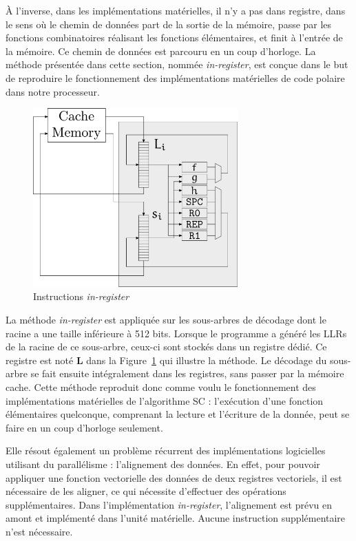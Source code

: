 \`A l'inverse, dans les implémentations matérielles, il n'y a pas dans registre, dans le sens où le chemin de données part de la sortie de la mémoire, passe par les fonctions combinatoires réalisant les fonctions élémentaires, et finit à l'entrée de la mémoire. Ce chemin de données est parcouru en un coup d'horloge. La méthode présentée dans cette section, nommée \textit{in-register}, est conçue dans le but de reproduire le fonctionnement des implémentations matérielles de code polaire dans notre processeur.

\begin{figure}[t]
\centering
\includegraphics[width=0.7\textwidth]{main/ch3_fig/in_register}
\caption{Instructions \textit{in-register}}
\label{fig:in-register}
\end{figure}

La méthode \textit{in-register} est appliquée sur les sous-arbres de décodage dont le \noeud racine a une taille inférieure à 512 bits.
Lorsque le programme a généré les LLRs de la racine de ce sous-arbre, ceux-ci sont stockés dans un registre dédié.
Ce registre est noté $\mathbold{L}$ dans la Figure~\ref{fig:in-register} qui illustre la méthode.
Le décodage du sous-arbre se fait ensuite intégralement dans les registres, sans passer par la mémoire cache.
Cette méthode reproduit donc comme voulu le fonctionnement des implémentations matérielles de l'algorithme SC : l'exécution d'une fonction élémentaires quelconque, comprenant la lecture et l'écriture de la donnée, peut se faire en un coup d'horloge seulement.

Elle résout également un problème récurrent des implémentations logicielles utilisant du parallélisme : l'alignement des données. En effet, pour pouvoir appliquer une fonction vectorielle des données de deux registres vectoriels, il est nécessaire de les aligner, ce qui nécessite d'effectuer des opérations supplémentaires. Dans l'implémentation \textit{in-register}, l'alignement est prévu en amont et implémenté dans l'unité matérielle. Aucune instruction supplémentaire n'est nécessaire. 

